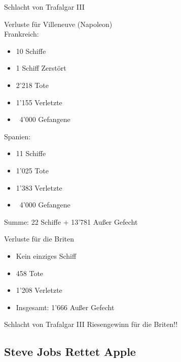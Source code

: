 \ifonline
\begin{frame}[c]{Schlacht von Trafalgar III}
    \begin{multicols}{2}
        Verluste für Villeneuve (Napoleon) \\
        Frankreich:
        \begin{itemize}
            \item<2-> 10 Schiffe
            \item<2-> 1 Schiff Zerstört
            \item<3-> 2'218 Tote
            \item<3-> 1'155 Verletzte
            \item<4-> ~4'000 Gefangene
        \end{itemize}
        Spanien:
        \begin{itemize}
            \item<2-> 11 Schiffe
            \item<3-> 1'025 Tote
            \item<3-> 1'383 Verletzte
            \item<4-> ~4'000 Gefangene
        \end{itemize}
         {Summe: 22 Schiffe + 13'781 Außer Gefecht}


        Verluste für die Briten
        \begin{itemize}
            \item<2-> Kein einziges Schiff
            \item<3-> 458 Tote
            \item<3-> 1'208 Verletzte
            \item<5-> Insgesamt: 1'666 Außer Gefecht
        \end{itemize}
        \pause
        \pause
        \pause
        \pause
    \end{multicols}
\end{frame}
\else
\begin{frame}{Schlacht von Trafalgar III}
    \Huge
    Riesengewinn für die Briten!!
\end{frame}
\fi



\subsection{Steve Jobs Rettet Apple}

